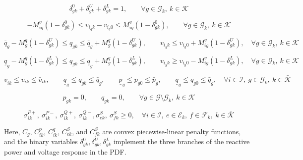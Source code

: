\documentclass{article}
\begin{document}
\begin{equation}
\delta_{gk}^{0} + \delta_{gk}^{U} + \delta_{gk}^{L} = 1,
\qquad \forall g \in \mathcal{G}_k,\ k \in \mathcal{K}
\tag{2.1o$'$}
\end{equation}

\begin{equation}
-M_{ig}^{v}(1-\delta_{gk}^{0})
\le v_{i_g k} - v_{i_g 0}
\le M_{ig}^{v}(1-\delta_{gk}^{0}),
\qquad \forall g \in \mathcal{G}_k,\ k \in \mathcal{K}
\tag{2.1o$''$}
\end{equation}

\begin{equation}
\bar{q}_g - M_g^q(1-\delta_{gk}^{U})
\le q_{gk}
\le \bar{q}_g + M_g^q(1-\delta_{gk}^{U}),
\qquad
v_{i_g k} \le v_{i_g 0} + M_{ig}^{v}(1-\delta_{gk}^{U}),
\quad \forall g \in \mathcal{G}_k,\ k \in \mathcal{K}
\tag{2.1o$'''$}
\end{equation}

\begin{equation}
\underline{q}_g - M_g^q(1-\delta_{gk}^{L})
\le q_{gk}
\le \underline{q}_g + M_g^q(1-\delta_{gk}^{L}),
\qquad
v_{i_g k} \ge v_{i_g 0} - M_{ig}^{v}(1-\delta_{gk}^{L}),
\quad \forall g \in \mathcal{G}_k,\ k \in \mathcal{K}
\tag{2.1o$''''$}
\end{equation}

\begin{equation}
\underline{v}_{ik} \le v_{ik} \le \bar{v}_{ik},
\qquad
\underline{q}_g \le q_{gk} \le \bar{q}_g,
\qquad
\underline{p}_g \le p_{g0} \le \bar{p}_g,
\qquad
\underline{q}_g \le q_{g0} \le \bar{q}_g,
\quad \forall i \in \mathcal{I},\ g \in \mathcal{G}_k,\ k \in \bar{\mathcal{K}}
\tag{2.1p}
\end{equation}

\begin{equation}
p_{gk} = 0, \qquad q_{gk} = 0,
\qquad \forall g \in \mathcal{G} \setminus \mathcal{G}_k,\ k \in \mathcal{K}
\tag{2.1q}
\end{equation}

\begin{equation}
\sigma_{ik}^{P+},\ \sigma_{ik}^{P-},\ \sigma_{ik}^{Q+},\ \sigma_{ik}^{Q-},
\sigma_{ek}^{S},\ \sigma_{fk}^{S} \ge 0,
\quad
\forall i \in \mathcal{I},\ e \in \mathcal{E}_k,\ f \in \mathcal{F}_k,\ k \in \bar{\mathcal{K}}
\tag{2.1r}
\end{equation}

Here, $C_g$, $C_{ik}^{p}$, $C_{ik}^{q}$, $C_{ek}^{S}$, and $C_{fk}^{S}$ are convex
piecewise-linear penalty functions, and the binary variables
$\delta_{gk}^{0}, \delta_{gk}^{U}, \delta_{gk}^{L}$ implement the three branches of
the reactive power and voltage response in the PDF.
\end{document}
